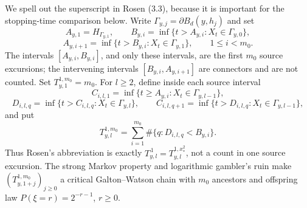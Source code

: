 \documentclass[12pt,reqno]{amsart}
\theoremstyle{plain}
\theoremstyle{definition}
\theoremstyle{remark}
\numberwithin{equation}{section}
\begin{document}
We spell out the superscript in Rosen (3.3), because it is important for
the stopping-time comparison below.  Write
$\Gamma_{y,j}=\partial B_d(y,h_j)$ and set
\[
A_{y,1}=H_{\Gamma_{y,1}},\qquad
 B_{y,i}=\inf\{t>A_{y,i}:X_t\in\Gamma_{y,0}\},
\]
\begin{equation}
A_{y,i+1}=\inf\{t>B_{y,i}:X_t\in\Gamma_{y,1}\},
                    \qquad 1\le i<m_0.\label{eq:ct-external-32b}
\end{equation}
The intervals $[A_{y,i},B_{y,i}]$, and only these intervals, are the
first $m_0$ source excursions; the intervening intervals
$[B_{y,i},A_{y,i+1}]$ are connectors and are not counted.  Set
$T_{y,1}^{1,m_0}=m_0$.  For $l\ge2$, define inside each source
interval
\[
C_{i,l,1}=\inf\{t\ge A_{y,i}:X_t\in\Gamma_{y,l-1}\},
\]
\[
D_{i,l,q}=\inf\{t>C_{i,l,q}:X_t\in\Gamma_{y,l}\},\qquad
 C_{i,l,q+1}=\inf\{t>D_{i,l,q}:X_t\in\Gamma_{y,l-1}\},
\]
and put
\begin{equation}
T_{y,l}^{1,m_0}=\sum_{i=1}^{m_0}
             \#\{q:D_{i,l,q}<B_{y,i}\}.\label{eq:ct-external-32c}
\end{equation}
Thus Rosen's abbreviation is exactly
$T_{y,l}^{\,1}=T_{y,l}^{1,x_*^2}$, not a count in one source
excursion.  The strong Markov property and logarithmic gambler's ruin
make $(T_{y,1+j}^{1,m_0})_{j\ge0}$ a critical Galton--Watson chain
with $m_0$ ancestors and offspring law
$P(\xi=r)=2^{-r-1}$, $r\ge0$.
\end{document}
